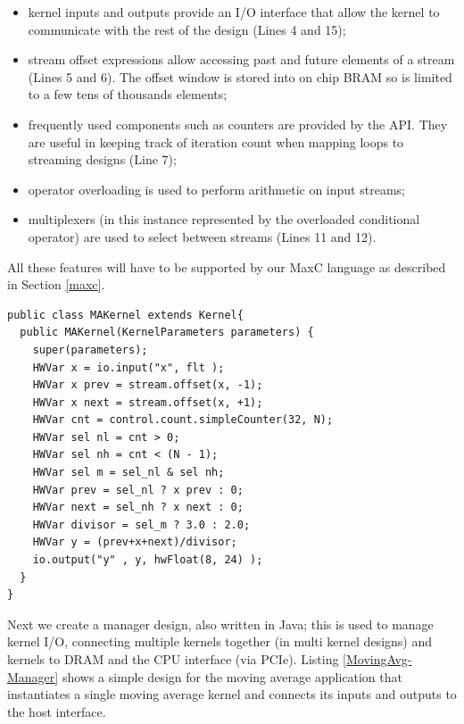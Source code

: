 \begin{itemize}

\item kernel inputs and outputs provide an I/O interface that allow the
  kernel to communicate with the rest of the design (Lines 4 and 15);

\item stream offset expressions allow accessing past and future elements
  of a stream (Lines 5 and 6). The offset window is stored into on
  chip BRAM so is limited to a few tens of thousands elements;

\item frequently used components such as counters are provided by the
  API. They are useful in keeping track of iteration count when
  mapping loops to streaming designs (Line 7);

\item operator overloading is used to perform arithmetic on input streams;

\item multiplexers (in this instance represented by the overloaded
  conditional operator) are used to select between streams (Lines 11
  and 12).

\end{itemize}

All these features will have to be supported by our MaxC language as
described in Section \ref{maxc}.


\begin{lstlisting}
public class MAKernel extends Kernel{
  public MAKernel(KernelParameters parameters) {
    super(parameters);
    HWVar x = io.input("x", flt );
    HWVar x prev = stream.offset(x, -1);
    HWVar x next = stream.offset(x, +1);
    HWVar cnt = control.count.simpleCounter(32, N);
    HWVar sel nl = cnt > 0;
    HWVar sel nh = cnt < (N - 1);
    HWVar sel m = sel_nl & sel nh;
    HWVar prev = sel_nl ? x prev : 0;
    HWVar next = sel_nh ? x next : 0;
    HWVar divisor = sel_m ? 3.0 : 2.0;
    HWVar y = (prev+x+next)/divisor;
    io.output("y" , y, hwFloat(8, 24) );
  }
}
\end{lstlisting}


Next we create a manager design, also written in Java; this is used to
manage kernel I/O, connecting multiple kernels together (in multi
kernel designs) and kernels to DRAM and the CPU interface (via
PCIe). Listing \ref{MovingAvg-Manager} shows a simple design for the
moving average application that instantiates a single moving average
kernel and connects its inputs and outputs to the host interface.

